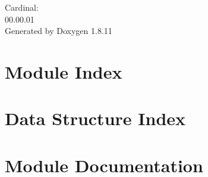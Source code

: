 \documentclass[twoside]{book}
\newcommand{\+}{\discretionary{\mbox{\scriptsize$\hookleftarrow$}}{}{}}
\newcommand{\clearemptydoublepage}{%
  \newpage{\pagestyle{empty}\cleardoublepage}%
}
\begin{document}
\hypersetup{pageanchor=false,
             bookmarksnumbered=true,
             pdfencoding=unicode
            }
\begin{titlepage}
\vspace*{7cm}
\begin{center}%
{\Large Cardinal\+: \\[1ex]\large 00.\+00.\+01 }\\
\vspace*{1cm}
{\large Generated by Doxygen 1.8.11}\\
\end{center}
\end{titlepage}
\clearemptydoublepage
\tableofcontents
\clearemptydoublepage
{}
\hypersetup{pageanchor=true}

\chapter{Module Index}

\chapter{Data Structure Index}

\chapter{Module Documentation}












\end{document}
